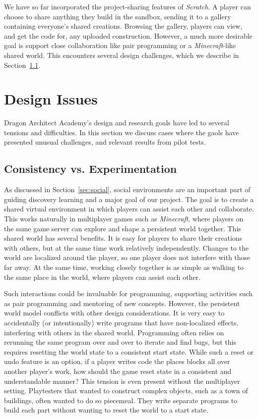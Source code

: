 \documentclass{sig-alternate}
\newcommand{\gametitle}{{\color{RoyalPurple} Dragon Architect Academy}}
\begin{document}
We have so far incorporated the project-sharing features of \emph{Scratch}.
A player can choose to share anything they build in the sandbox, sending it to a gallery containing everyone's shared creations.
Browsing the gallery, players can view, and get the code for, any uploaded construction.
However, a much more desirable goal is support close collaboration like pair programming or a \emph{Minecraft}-like shared world.
This encounters several design challenges, which we describe in Section~\ref{sec:multiplayer}.

\section{Design Issues}
\gametitle{}'s design and research goals have led to several tensions and difficulties.
In this section we discuss cases where the gaols have presented unusual challenges, and relevant results from pilot tests.

\subsection{Consistency vs. Experimentation}
\label{sec:multiplayer}

As discussed in Section~\ref{sec:social}, social environments are an important part of guiding discovery learning and a major goal of our project.
The goal is to create a shared virtual environment in which players can assist each other and collaborate.
This works naturally in multiplayer games such as \emph{Minecraft}, where players on the same game server can explore and shape a persistent world together.
This shared world has several benefits.
It is easy for players to share their creations with others, but at the same time work relatively independently.
Changes to the world are localized around the player, so one player does not interfere with those far away.
At the same time, working closely together is as simple as walking to the same place in the world, where players can assist each other.

Such interactions could be invaluable for programming, supporting activities such as pair programming and mentoring of new concepts.
However, the persistent world model conflicts with other design considerations.
It is very easy to accidentally (or intentionally) write programs that have non-localized effects, interfering with others in the shared world.
Programming often relies on rerunning the same program over and over to iterate and find bugs, but this requires resetting the world state to a consistent start state.
While such a reset or undo feature is an option, if a player writes code the places blocks all over another player's work, how should the game reset state in a consistent and understandable manner?
This tension is even present without the multiplayer setting.
Playtesters that wanted to construct complex objects, such as a town of buildings, often wanted to do so piecemeal. They write separate programs to build each part without wanting to reset the world to a start state.
\end{document}
